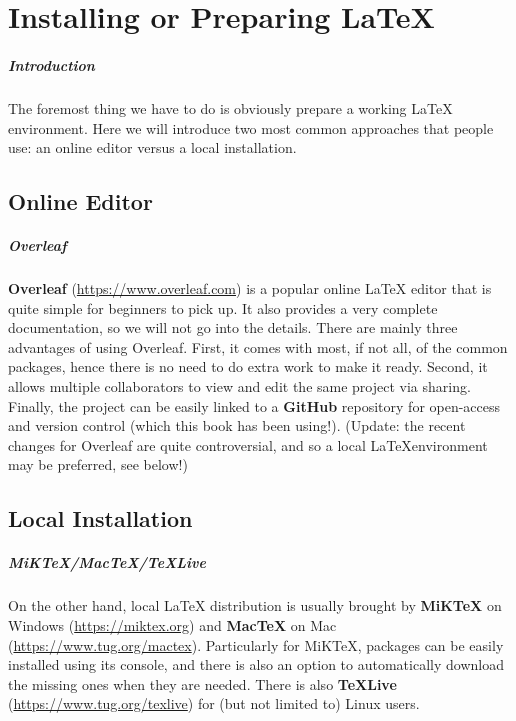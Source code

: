 \setcounter{chapter}{-1}
\chapter{Installing or Preparing \LaTeX{}}
\label{chap:install}

\paragraph{Introduction} The foremost thing we have to do is obviously prepare a working \LaTeX{} environment. Here we will introduce two most common approaches that people use: an online editor versus a local installation.

\section{Online Editor}

\paragraph{Overleaf}
\textbf{Overleaf} (\href{https://www.overleaf.com}{https://www.overleaf.com}) is a popular online \LaTeX{} editor that is quite simple for beginners to pick up. It also provides a very complete documentation, so we will not go into the details. There are mainly three advantages of using Overleaf. First, it comes with most, if not all, of the common packages, hence there is no need to do extra work to make it ready. Second, it allows multiple collaborators to view and edit the same project via sharing. Finally, the project can be easily linked to a \textbf{GitHub} repository for open-access and version control (which this book has been using!). (Update: the recent changes for Overleaf are quite controversial, and so a local \LaTeX environment may be preferred, see below!) 

\section{Local Installation}

\paragraph{MiKTeX/MacTeX/TeXLive}
On the other hand, local \LaTeX{} distribution is usually brought by \textbf{MiKTeX} on Windows (\href{https://miktex.org}{https://miktex.org}) and \textbf{MacTeX} on Mac (\href{https://www.tug.org/mactex}{https://\allowbreak www.tug.org/mactex}). Particularly for MiKTeX, packages can be easily installed using its console, and there is also an option to automatically download the missing ones when they are needed. There is also \textbf{TeXLive} (\href{https://www.tug.org/texlive}{https://www.tug.org/\allowbreak texlive}) for (but not limited to) Linux users.

